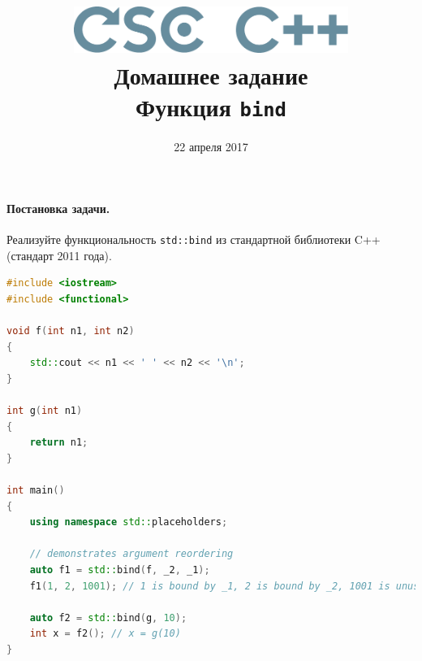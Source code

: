 \documentclass[a4paper,10pt]{article}
\begin{document}

\lstset{
  basicstyle=\ttfamily,
  columns=fullflexible
}

\newcommand{\cpp}[1]{{\tt #1}}

\title{\includegraphics[height=15mm]{../CSCCPP}\\[1em]
Домашнее задание  \\ Функция \cpp{bind}}
\preauthor{}
\author{}
\postauthor{}
\date{22 апреля 2017}

\maketitle

\paragraph{Постановка задачи.}
Реализуйте функциональность \cpp{std::bind} из стандартной библиотеки C++ (стандарт 2011 года).
\begin{lstlisting}[language=c++,frame=single]
#include <iostream>
#include <functional>
 
void f(int n1, int n2)
{
    std::cout << n1 << ' ' << n2 << '\n';
}
 
int g(int n1)
{
    return n1;
}
 
int main()
{
    using namespace std::placeholders;
 
    // demonstrates argument reordering
    auto f1 = std::bind(f, _2, _1);
    f1(1, 2, 1001); // 1 is bound by _1, 2 is bound by _2, 1001 is unused

    auto f2 = std::bind(g, 10);
    int x = f2(); // x = g(10)
}
\end{lstlisting}
\end{document}

